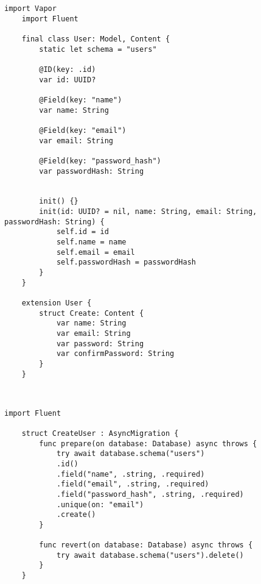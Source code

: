 \begin{lstlisting}[caption=Model file]
    import Vapor
    import Fluent
    
    final class User: Model, Content {
        static let schema = "users"
        
        @ID(key: .id)
        var id: UUID?
        
        @Field(key: "name")
        var name: String
        
        @Field(key: "email")
        var email: String
        
        @Field(key: "password_hash")
        var passwordHash: String
        
        
        init() {}
        init(id: UUID? = nil, name: String, email: String, passwordHash: String) {
            self.id = id
            self.name = name
            self.email = email
            self.passwordHash = passwordHash
        } 
    }
    
    extension User {
        struct Create: Content {
            var name: String
            var email: String
            var password: String
            var confirmPassword: String
        }
    }
    
    
\end{lstlisting}

\begin{lstlisting}[caption=Migration file]
    import Fluent
    
    struct CreateUser : AsyncMigration {
        func prepare(on database: Database) async throws {
            try await database.schema("users")
            .id()
            .field("name", .string, .required)
            .field("email", .string, .required)
            .field("password_hash", .string, .required)
            .unique(on: "email")
            .create()
        }
        
        func revert(on database: Database) async throws {
            try await database.schema("users").delete()
        }
    }
    
    
\end{lstlisting}

